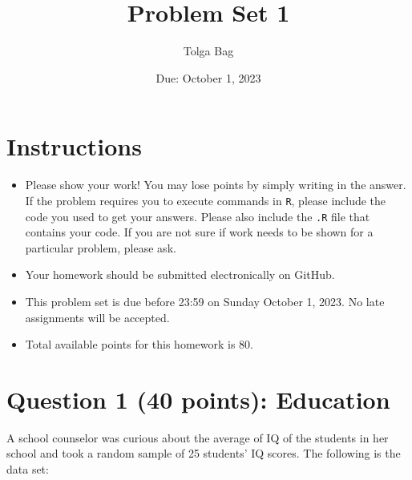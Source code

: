 \documentclass[12pt,letterpaper]{article}
\title{Problem Set 1}
\date{Due: October 1, 2023}
\author{Tolga Bag}
\begin{document}
	\maketitle
	
	\section*{Instructions}
	\begin{itemize}
	\item Please show your work! You may lose points by simply writing in the answer. If the problem requires you to execute commands in \texttt{R}, please include the code you used to get your answers. Please also include the \texttt{.R} file that contains your code. If you are not sure if work needs to be shown for a particular problem, please ask.
\item Your homework should be submitted electronically on GitHub.
\item This problem set is due before 23:59 on Sunday October 1, 2023. No late assignments will be accepted.
\item Total available points for this homework is 80.
	\end{itemize}
	
	\vspace{1cm}
	\section*{Question 1 (40 points): Education}

A school counselor was curious about the average of IQ of the students in her school and took a random sample of 25 students' IQ scores. The following is the data set:\\


  

\vspace{1cm}
\end{document}
